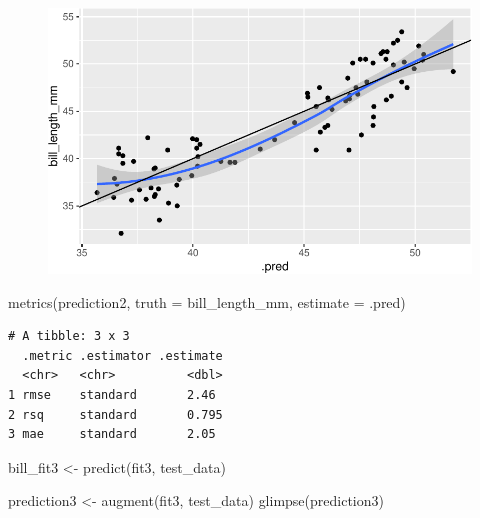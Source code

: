 \documentclass[
  letterpaper,
  DIV=11,
  numbers=noendperiod]{scrreprt}
\newenvironment{Shaded}{\begin{snugshade}}{\end{snugshade}}
\newcommand{\AttributeTok}[1]{\textcolor[rgb]{0.40,0.45,0.13}{#1}}
\newcommand{\FunctionTok}[1]{\textcolor[rgb]{0.28,0.35,0.67}{#1}}
\newcommand{\NormalTok}[1]{\textcolor[rgb]{0.00,0.23,0.31}{#1}}
\newcommand{\OtherTok}[1]{\textcolor[rgb]{0.00,0.23,0.31}{#1}}
\begin{document}
\begin{figure}[H]

{\centering \includegraphics{./10-model_selection_files/figure-pdf/unnamed-chunk-32-1.pdf}

}

\end{figure}

\begin{Shaded}
\begin{Highlighting}[]
\FunctionTok{metrics}\NormalTok{(prediction2, }\AttributeTok{truth =}\NormalTok{ bill\_length\_mm, }\AttributeTok{estimate =}\NormalTok{ .pred)}
\end{Highlighting}
\end{Shaded}

\begin{verbatim}
# A tibble: 3 x 3
  .metric .estimator .estimate
  <chr>   <chr>          <dbl>
1 rmse    standard       2.46 
2 rsq     standard       0.795
3 mae     standard       2.05 
\end{verbatim}

\begin{Shaded}
\begin{Highlighting}[]
\NormalTok{bill\_fit3 }\OtherTok{\textless{}{-}} \FunctionTok{predict}\NormalTok{(fit3, test\_data)}

\NormalTok{prediction3 }\OtherTok{\textless{}{-}} \FunctionTok{augment}\NormalTok{(fit3, test\_data)}
\FunctionTok{glimpse}\NormalTok{(prediction3)}
\end{Highlighting}
\end{Shaded}
\end{document}
